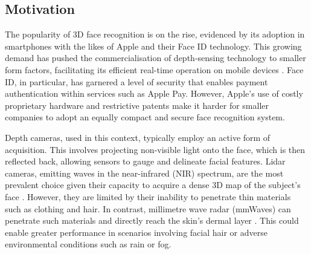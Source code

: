 \documentclass{mpaper}
\begin{document}
\subsection{Motivation}
The popularity of 3D face recognition is on the rise, evidenced by its adoption in smartphones with the likes of Apple and their Face ID \cite{apple-faceid} technology. This growing demand has pushed the commercialisation of depth-sensing technology to smaller form factors, facilitating its efficient real-time operation on mobile devices \cite{soumya2023recent}. Face ID, in particular, has garnered a level of security that enables payment authentication within services such as Apple Pay. However, Apple's use of costly proprietary hardware and restrictive patents make it harder for smaller companies to adopt an equally compact and secure face recognition system.

Depth cameras, used in this context, typically employ an active form of acquisition. This involves projecting non-visible light onto the face, which is then reflected back, allowing sensors to gauge and delineate facial features. Lidar cameras, emitting waves in the near-infrared (NIR) spectrum, are the most prevalent choice given their capacity to acquire a dense 3D map of the subject's face \cite{wang2020evolution}. However, they are limited by their inability to penetrate thin materials such as clothing and hair. In contrast, millimetre wave radar (mmWaves) can penetrate such materials and directly reach the skin's dermal layer \cite{vizard2006advances}. This could enable greater performance in scenarios involving facial hair or adverse environmental conditions such as rain or fog.
\end{document}
